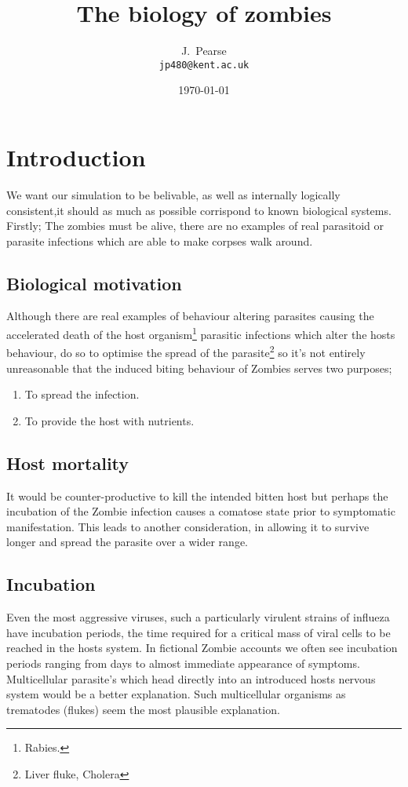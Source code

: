 \documentclass[a4paper,12pt]{article}
\begin{document}
\title{The biology of zombies}
\author{J.~Pearse\\{\small\tt jp480@kent.ac.uk}}
\date{\today}

\maketitle

\section{Introduction}
We want our simulation to be belivable, as well as internally logically consistent,it should as much as possible corrispond to known biological systems. Firstly; The zombies must be alive, there are no examples of real parasitoid or parasite infections which are able to make corpses walk around.

\subsection{Biological motivation}
Although there are real examples of behaviour altering parasites causing the accelerated death of the host organism\footnote{Rabies.} parasitic infections which alter the hosts behaviour, do so to optimise the spread of the parasite\footnote{Liver fluke, Cholera} so it's not entirely unreasonable that the induced biting behaviour of Zombies serves two purposes;\begin{enumerate}
\item To spread the infection.
\item To provide the host with nutrients.
\end{enumerate}
\subsection{Host mortality}
It would be counter-productive to kill the intended bitten host but perhaps the incubation of the Zombie infection causes a comatose state prior to symptomatic manifestation.
This leads to another consideration, in allowing it to survive longer and spread the parasite over a wider range.
\subsection{Incubation}
Even the most aggressive viruses, such a particularly virulent strains of influeza have incubation periods, the time required for a critical mass of viral cells to be reached in the hosts system. In fictional Zombie accounts we often see incubation periods ranging from days to almost immediate appearance of symptoms. Multicellular parasite's which head directly into an introduced hosts nervous system would be a better explanation. Such multicellular organisms as trematodes (flukes) seem the most plausible explanation.
\end{document}
